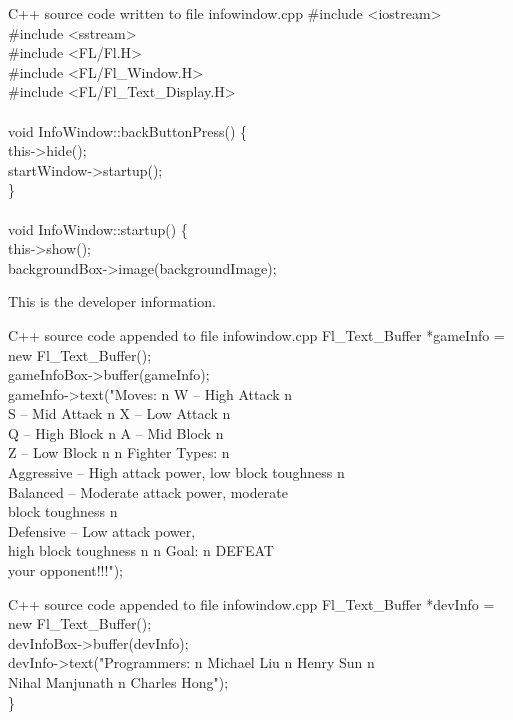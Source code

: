 \documentclass{article}
\begin{document}
\begin{GFT}{C++ source code written to file infowindow.cpp}
\+\#include <iostream>\\
\+\#include <sstream>\\
\+\#include <FL/Fl.H>\\
\+\#include <FL/Fl\_Window.H>\\
\+\#include <FL/Fl\_Text\_Display.H>\\
\+\\
\+void InfoWindow::backButtonPress() \{\\
\+    this->hide();\\
\+    startWindow->startup();\\
\+\}\\
\+\\
\+void InfoWindow::startup() \{\\
\+    this->show();\\
\+    backgroundBox->image(backgroundImage);\\
\end{GFT}
\clearpage
This is the developer information.
\begin{GFT}{C++ source code appended to file infowindow.cpp}
\+    Fl\_Text\_Buffer *gameInfo = new Fl\_Text\_Buffer();\\
\+    gameInfoBox->buffer(gameInfo);\\
\+    gameInfo->text("Moves: \Backslash{}n W -- High Attack \Backslash{}n \\
\+                    S -- Mid Attack \Backslash{}n X -- Low Attack \Backslash{}n \\
\+                    Q -- High Block \Backslash{}n A -- Mid Block \Backslash{}n \\
\+                    Z -- Low Block \Backslash{}n  \Backslash{}n Fighter Types: \Backslash{}n\\
\+                    Aggressive -- High attack power, low block toughness \Backslash{}n\\
\+                    Balanced -- Moderate attack power, moderate \\
\+                    block toughness \Backslash{}n \\
\+                    Defensive -- Low attack power, \\
\+                    high block toughness \Backslash{}n \Backslash{}n Goal: \Backslash{}n DEFEAT \\
\+                    your opponent!!!");\\
\end{GFT}
\clearpage
\begin{GFT}{C++ source code appended to file infowindow.cpp}
\+    Fl\_Text\_Buffer *devInfo = new Fl\_Text\_Buffer();\\
\+    devInfoBox->buffer(devInfo);\\
\+    devInfo->text("Programmers: \Backslash{}n Michael Liu \Backslash{}n Henry Sun \Backslash{}n \\
\+                   Nihal Manjunath \Backslash{}n Charles Hong");\\
\+\}\\
\end{GFT}
\end{document}
